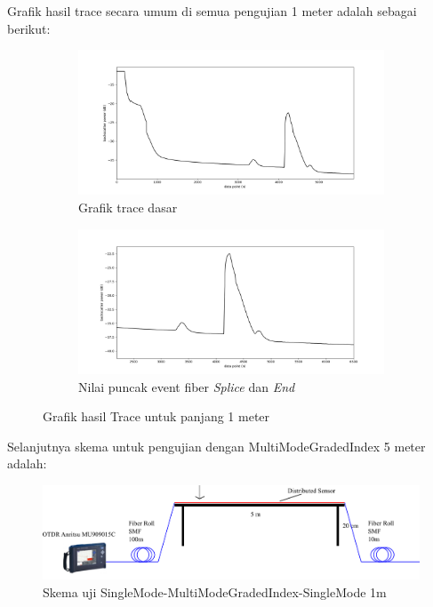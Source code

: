\documentclass[12pt]{article}
\begin{document}
	Grafik hasil trace secara umum di semua pengujian 1 meter adalah sebagai berikut:
	
	\begin{figure}[!ht]
		\centering
		\captionsetup{justification=centering}
		\begin{subfigure}[h]{0.8\textwidth}
			\includegraphics[width=\textwidth]{images/Bab_4/Bab_4_5d1}	
			\caption{\small{Grafik trace dasar}}		
		\end{subfigure}
		\begin{subfigure}[h]{0.8\textwidth}
			\includegraphics[width=\linewidth]{images/Bab_4/Bab_4_5d2}
			\caption{\small{Nilai puncak event fiber \textit{Splice} dan \textit{End}}}			
		\end{subfigure}
		\caption[Uji Pagar]{\small{Grafik hasil Trace untuk panjang 1 meter}}
	\end{figure}

	Selanjutnya skema untuk pengujian dengan MultiModeGradedIndex 5 meter adalah:
	
	\begin{figure}[!ht]
		\centering
		\captionsetup{justification=centering}
		\includegraphics[width=0.7\linewidth]{images/Bab_4/uji_5m}
		\caption[Trace SMF-SMF]{\small{Skema uji SingleMode-MultiModeGradedIndex-SingleMode 1m}}
	\end{figure}
	
\end{document}
